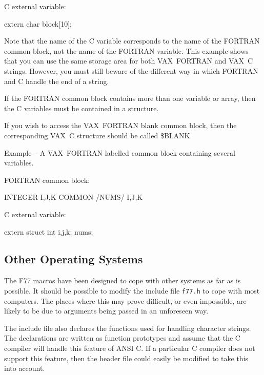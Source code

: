 \documentclass[twoside,11pt,nolof]{starlink}
\newcounter{examples}
\begin{document}
C external variable:
\begin{small}
\begin{terminalv}
extern char block[10];
\end{terminalv}
\end{small}

Note that the name of the C variable corresponds to the name of the FORTRAN
common block, not the name of the FORTRAN variable. This example shows that you
can use the same storage area for both VAX~FORTRAN and VAX~C strings. However, you must
still beware of the different way in which FORTRAN and C handle the end of
a string.

If the FORTRAN common block contains more than one variable or array, then the
C variables must be contained in a structure.

If you wish to access the VAX~FORTRAN blank common block, then the
corresponding VAX~C structure should be called \$BLANK.

\label{vms_common2}
\begin{center}
Example\latex{~\ref{vms_common2}}
-- A VAX~FORTRAN labelled common block containing several variables.
\end{center}
\nopagebreak[4]
FORTRAN common block:
\begin{small}
\begin{terminalv}
      INTEGER I,J,K
      COMMON /NUMS/ I,J,K
\end{terminalv}
\end{small}

C external variable:
\begin{small}
\begin{terminalv}
extern struct { int i,j,k; } nums;
\end{terminalv}
\end{small}

\subsection{Other Operating Systems}

The F77 macros have been designed to cope with other systems as far as is
possible. It should be possible to modify the include file \texttt{f77.h} to
cope with most computers.
The places where this may prove difficult, or even impossible,
are likely to be due to arguments being passed in an unforeseen way.

The include file also declares the functions used for handling character
strings. The declarations are written as function prototypes and assume that
the C compiler will handle this feature of ANSI C\@. If a particular C compiler
does not support this feature, then the header file could easily be modified to
take this into account.
\end{document}
